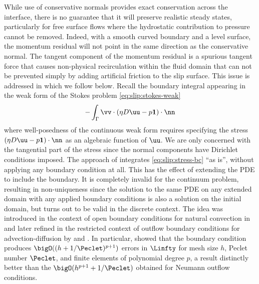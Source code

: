While use of conservative normals provides exact conservation across the interface, there is no guarantee that it will preserve realistic steady states, particularly for free surface flows where the hydrostatic contribution to pressure cannot be removed.
Indeed, with a smooth curved boundary and a level surface, the momentum residual will not point in the same direction as the conservative normal.
The tangent component of the momentum residual is a spurious tangent force that causes non-physical recirculation within the fluid domain that can not be prevented simply by adding artificial friction to the slip surface.
This issue is addressed in \citet{behr2004application} which we follow below.
Recall the boundary integral appearing in the weak form of the Stokes problem \eqref{eq:slip:stokes-weak}
\begin{equation}\label{eq:slip:stress-bc}
  - \int_\Gamma \vv\cdot (\eta D\uu - p\bm 1)\cdot\nn
\end{equation}
where well-posedness of the continuous weak form requires specifying the stress $(\eta D\uu - p\bm 1)\cdot\nn$ as an algebraic function of $\uu$.
We are only concerned with the tangential part of the stress since the normal components have Dirichlet conditions imposed.
The approach of \citet{behr2004application} integrates \eqref{eq:slip:stress-bc} ``as is'', without applying any boundary condition at all.
This has the effect of extending the PDE to include the boundary.
It is completely invalid for the continuum problem, resulting in non-uniqueness since the solution to the same PDE on any extended domain with any applied boundary conditions is also a solution on the initial domain, but turns out to be valid in the discrete context.
The idea was introduced in the context of open boundary conditions for natural convection in \citet{papanastasiou1992nob} and later refined 
in the restricted context of outflow boundary conditions for advection-diffusion by \citet{griffiths1997nbc} and \citet{renardy1997inb}.
In particular, \citet{griffiths1997nbc} showed that the boundary condition produces $\bigO((h+1/\Peclet)^{p+1})$ errors in $\Linfty$ for mesh size $h$, Peclet number $\Peclet$, and finite elements of polynomial degree $p$, a result distinctly better than the $\bigO(h^{p+1} + 1/\Peclet)$ obtained for Neumann outflow conditions.

